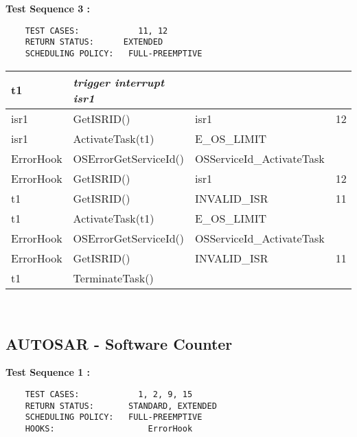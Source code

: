 \documentclass[10pt]{article}
\newlength{\Li}\settowidth{\Li}{Running}
\newlength{\Lii}\setlength{\Lii}{7cm}
\newlength{\Liiii}\setlength{\Liiii}{0.9cm}
\newlength{\Liii}\setlength{\Liii}{\textwidth} \addtolength{\Liii}{-\Li} \addtolength{\Liii}{-\Lii} \addtolength{\Liii}{-\Liiii}
\begin{document}
	\textbf{Test Sequence 3 :}
	\begin{lstlisting}
	TEST CASES:		       11, 12
	RETURN STATUS:	  	EXTENDED
	SCHEDULING POLICY:   FULL-PREEMPTIVE
	\end{lstlisting}
	
	
	\begin{supertabular}{|p{\Li}|p{\Lii}|p{\Liii}|p{\Liiii}|} \hline 
	t1		& \textit{trigger interrupt isr1}									& 						& \\ \hline
	isr1		& GetISRID()												& isr1					& 12 \\ \hline
	isr1		& ActivateTask(t1)											& E\_OS\_LIMIT			& \\ \hline
	ErrorHook	& OSErrorGetServiceId()										& OSServiceId\_ActivateTask	& \\ \hline
	ErrorHook	& GetISRID()												& isr1					& 12 \\ \hline
	t1		& GetISRID()												& INVALID\_ISR			& 11 \\ \hline
	t1		& ActivateTask(t1)											& E\_OS\_LIMIT			& \\ \hline
	ErrorHook	& OSErrorGetServiceId()										& OSServiceId\_ActivateTask	& \\ \hline
	ErrorHook	& GetISRID()												& INVALID\_ISR			& 11 \\ \hline
	t1		& TerminateTask()											& 						& \\ \hline
	\end{supertabular}\\
	
\subsection{AUTOSAR - Software Counter}

\settowidth{\Li}{Error-Hook}
\setlength{\Liii}{\textwidth} \addtolength{\Liii}{-\Li} \addtolength{\Liii}{-\Lii} \addtolength{\Liii}{-\Liiii}

	\textbf{Test Sequence 1 :}
	\begin{lstlisting}
	TEST CASES:		       1, 2, 9, 15
	RETURN STATUS:	  	 STANDARD, EXTENDED
	SCHEDULING POLICY:   FULL-PREEMPTIVE
	HOOKS:			         ErrorHook
	\end{lstlisting}
	
	
\end{document}
